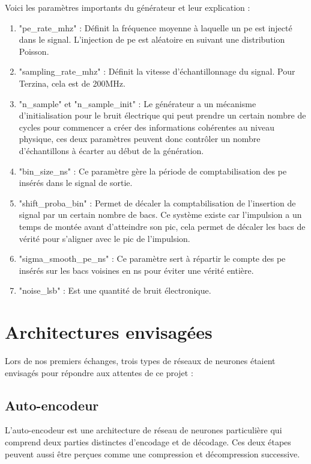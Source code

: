 Voici les paramètres importants du générateur et leur explication :
\begin{enumerate}
    \item "pe\_rate\_mhz" : Définit la fréquence moyenne à laquelle un \gls{pe} est injecté dans le signal.
        L'injection de \gls{pe} est aléatoire en suivant une distribution Poisson.
    \item "sampling\_rate\_mhz" : Définit la vitesse d'échantillonnage du signal. Pour Terzina, cela est de 200MHz.
    \item "n\_sample" et "n\_sample\_init" : Le générateur a un mécanisme d'initialisation pour le bruit électrique 
        qui peut prendre un certain nombre de cycles pour commencer a créer des informations cohérentes au niveau physique, 
        ces deux paramètres peuvent donc contrôler un nombre d'échantillons à écarter au début de la génération.
    \item "bin\_size\_ns" : Ce paramètre gère la période de comptabilisation des \gls{pe} insérés dans le signal de sortie.
    \item "shift\_proba\_bin" : Permet de décaler la comptabilisation de l'insertion de signal par un certain nombre de bacs.
        Ce système existe car l'impulsion a un temps de montée avant d'atteindre son pic, cela permet de décaler les bacs 
        de vérité pour s'aligner avec le pic de l'impulsion.
    \item "sigma\_smooth\_pe\_ns" : Ce paramètre sert à répartir le compte des \gls{pe} insérés sur les bacs voisines en ns
        pour éviter une vérité entière. 
    \item "noise\_lsb" : Est une quantité de bruit électronique.
\end{enumerate}

\section{Architectures envisagées}
Lors de nos premiers échanges, trois types de réseaux de neurones étaient envisagés pour répondre aux attentes de ce projet :

\subsection{Auto-encodeur}
L'auto-encodeur est une architecture de réseau de neurones particulière qui comprend deux parties distinctes d'encodage et de décodage. 
Ces deux étapes peuvent aussi être perçues comme une compression et décompression successive. \cite{IbmAutoencoder}

